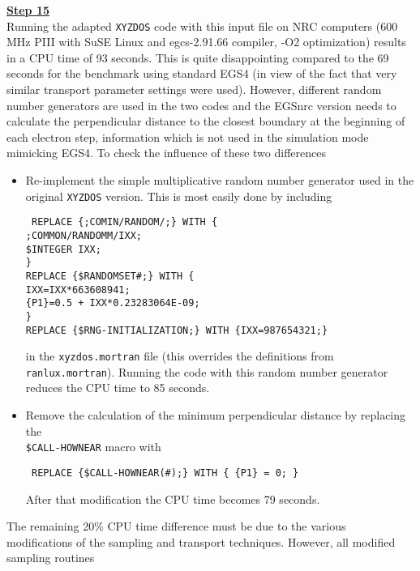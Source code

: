 \noindent
\underline{\bf Step 15} \hfill \\
Running the adapted {\tt XYZDOS} code with this input file on NRC computers 
(600 MHz PIII with SuSE Linux and egcs-2.91.66 compiler, -O2 optimization) 
results in a CPU time of 93 seconds. This is quite 
disappointing compared to the  
69 seconds for the benchmark using standard EGS4 
(in view of the fact that very similar 
transport parameter settings were used). However, 
different random number generators are used in the two codes 
and the EGSnrc version needs to calculate the perpendicular 
distance to the closest boundary at the beginning of each electron step, 
information which is not used in the simulation mode mimicking 
EGS4. To check the influence of these two differences
\begin{itemize}
\item
Re-implement the simple multiplicative random number generator 
used in the original {\tt XYZDOS} version. This is most easily 
done by including 
\begin{flushleft}{\tt
REPLACE \{;COMIN/RANDOM/;\} WITH \{ \\
\quad ;COMMON/RANDOMM/IXX; \\
\quad \$INTEGER IXX; \\
\} \\
REPLACE \{\$RANDOMSET\#;\} WITH \{ \\
\quad IXX=IXX*663608941; \\
\quad \{P1\}=0.5 + IXX*0.23283064E-09; \\
\} \\
REPLACE \{\$RNG-INITIALIZATION;\} WITH \{IXX=987654321;\} }
\end{flushleft}
in the {\tt xyzdos.mortran} file (this overrides the 
definitions from {\tt ranlux.mortran}). Running the code 
with this random number generator reduces the CPU time to 
85 seconds.

\item
Remove the calculation of the minimum perpendicular 
distance by replacing the \\{\tt \$CALL-HOWNEAR} macro with 
\begin{flushleft}{\tt
REPLACE \{\$CALL-HOWNEAR(\#);\} WITH \{ \{P1\} = 0; \} }
\end{flushleft}
After that modification the CPU time becomes 79 seconds. 
\end{itemize}
The remaining 20\% CPU time difference must be due to 
the various  modifications of the sampling and transport 
techniques. However, all modified sampling routines 
